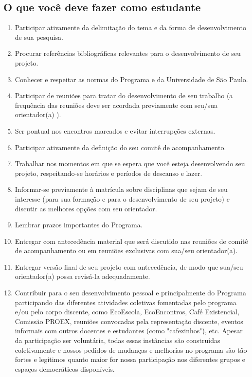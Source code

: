 \documentclass[twoside a4paper 12pt]{report}
\begin{document}
\subsection{O que você deve fazer como estudante}
\begin{enumerate}
\item Participar ativamente da delimitação do tema e da forma de desenvolvimento de sua pesquisa.
\item Procurar referências bibliográficas relevantes para o desenvolvimento de seu projeto.
\item Conhecer e respeitar as normas do Programa e da Universidade de São Paulo.
\item Participar de reuniões para tratar do desenvolvimento de seu
  trabalho (a frequência das reuniões deve ser acordada previamente
  com seu/sua orientador(a) ).
\item Ser pontual nos encontros marcados e evitar interrupções externas.
\item Participar ativamente da definição do seu comitê de acompanhamento.
\item Trabalhar nos momentos em que se espera que você esteja
  desenvolvendo seu projeto, respeitando-se horários e períodos de
  descanso e lazer.
\item Informar-se previamente à matrícula sobre disciplinas que sejam
  de seu interesse (para sua formação e para o desenvolvimento de seu
  projeto) e discutir as melhores opções com seu orientador.
\item Lembrar prazos importantes do Programa.
\item Entregar com antecedência material que será discutido nas
  reuniões de comitê de acompanhamento ou em reuniões exclusivas com
  sua/seu orientador(a).
\item Entregar versão final de seu projeto com antecedência, de modo
  que sua/seu orientador(a) possa revisá-la adequadamente.
\item Contribuir para o seu desenvolvimento pessoal e principalmente
  do Programa participando das diferentes atividades coletivas
  fomentadas pelo programa e/ou pelo corpo discente, como EcoEscola,
  EcoEncontros, Café Existencial, Comissão PROEX, reuniões convocadas
  pela representação discente, eventos informais com outros docentes e
  estudantes (como "cafezinhos"), etc. Apesar da participação ser
  voluntária, todas essas instâncias são construídas coletivamente e
  nossos pedidos de mudanças e melhorias no programa são tão fortes e
  legítimos quanto maior for nossa participação nos diferentes grupos
  e espaços democráticos disponíveis.
\end{enumerate}
\end{document}
